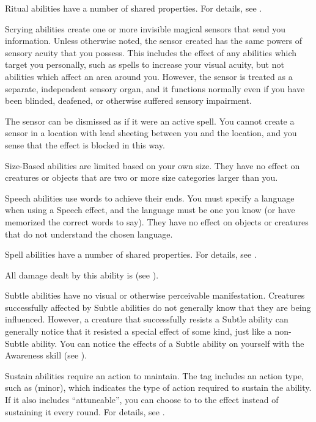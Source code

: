    Ritual abilities have a number of shared properties.
  For details, see .

   Scrying abilities create one or more invisible magical sensors that send you information.
  Unless otherwise noted, the sensor created has the same powers of sensory acuity that you possess.
  This includes the effect of any abilities which target you personally, such as spells to increase your visual acuity, but not abilities which affect an area around you.
  However, the sensor is treated as a separate, independent sensory organ, and it functions normally even if you have been blinded, deafened, or otherwise suffered sensory impairment.
  \par The sensor can be dismissed as if it were an active spell.
  You cannot create a sensor in a location with lead sheeting between you and the location, and you sense that the effect is blocked in this way.

   Size-Based abilities are limited based on your own size.
  They have no effect on creatures or objects that are two or more size categories larger than you.

   Speech abilities use words to achieve their ends.
  You must specify a language when using a Speech effect, and the language must be one you know (or have memorized the correct words to say). They have no effect on objects or creatures that do not understand the chosen language.

   Spell abilities have a number of shared properties.
  For details, see .

   All damage dealt by this ability is  (see ).

   Subtle abilities have no visual or otherwise perceivable manifestation.
  Creatures successfully affected by Subtle abilities do not generally know that they are being influenced.
  However, a creature that successfully resists a Subtle ability can generally notice that it resisted a special effect of some kind, just like a non-Subtle ability.
  You can notice the effects of a Subtle ability on yourself with the Awareness skill (see ).

   Sustain abilities require an action to maintain.
  The tag includes an action type, such as (minor), which indicates the type of action required to sustain the ability.
  If it also includes ``attuneable'', you can choose to  to the effect instead of sustaining it every round.
  For details, see .

